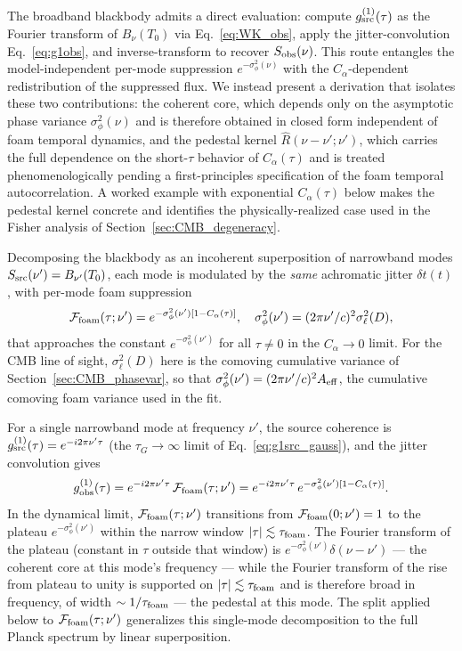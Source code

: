 \documentclass[aps,prd,onecolumn,amsmath,amssymb]{revtex4-2}
\begin{document}
The broadband blackbody admits a direct evaluation: compute
$g^{(1)}_{\rm src}(\tau)$ as the Fourier transform of $B_\nu(T_0)$
via Eq.~\eqref{eq:WK_obs}, apply the jitter-convolution
Eq.~\eqref{eq:g1obs}, and inverse-transform to recover
$S_{\rm obs}(\nu)$.  This route entangles the model-independent
per-mode suppression $e^{-\sigma_\phi^2(\nu)}$ with the
$C_\alpha$-dependent redistribution of the suppressed flux.  We
instead present a derivation that isolates these two contributions:
the coherent core, which depends only on the asymptotic phase
variance $\sigma_\phi^2(\nu)$ and is therefore obtained in closed
form independent of foam temporal dynamics, and the pedestal kernel
$\hat{R}(\nu-\nu';\nu')$, which carries the full dependence on the
short-$\tau$ behavior of $C_\alpha(\tau)$ and is treated
phenomenologically pending a first-principles specification of the
foam temporal autocorrelation.  A worked example with exponential
$C_\alpha(\tau)$ below makes the pedestal kernel concrete and
identifies the physically-realized case used in the Fisher analysis
of Section~\ref{sec:CMB_degeneracy}.

Decomposing the blackbody as an incoherent superposition of narrowband
modes $S_{\rm src}(\nu')=B_{\nu'}(T_0)$, each mode is modulated by the
\emph{same} achromatic jitter $\delta t(t)$, with per-mode foam suppression
\begin{equation}
  \mathcal{F}_{\rm foam}(\tau;\nu')
    = e^{-\sigma_\phi^2(\nu')[1-C_\alpha(\tau)]},
  \quad
  \sigma_\phi^2(\nu')=(2\pi\nu'/c)^2\sigma_\ell^2(D),
\end{equation}
that approaches the constant $e^{-\sigma_\phi^2(\nu')}$ for all
$\tau\neq 0$ in the $C_\alpha\to 0$ limit.  For the CMB line of sight,
$\sigma_\ell^2(D)$ here is the comoving cumulative variance of
Section~\ref{sec:CMB_phasevar}, so that $\sigma_\phi^2(\nu')=(2\pi\nu'/c)^2
A_{\rm eff}$, the cumulative comoving foam variance used in
the fit.

For a single narrowband mode at frequency $\nu'$, the source
coherence is $g^{(1)}_{\rm src}(\tau)=e^{-i2\pi\nu'\tau}$ (the
$\tau_G\to\infty$ limit of Eq.~\eqref{eq:g1src_gauss}), and the
jitter convolution gives
\[
  g^{(1)}_{\rm obs}(\tau)
    = e^{-i2\pi\nu'\tau}\,\mathcal{F}_{\rm foam}(\tau;\nu')
    = e^{-i2\pi\nu'\tau}\,e^{-\sigma_\phi^2(\nu')[1-C_\alpha(\tau)]}.
\]
In the dynamical limit, $\mathcal{F}_{\rm foam}(\tau;\nu')$
transitions from $\mathcal{F}_{\rm foam}(0;\nu')=1$ to the plateau
$e^{-\sigma_\phi^2(\nu')}$ within the narrow window
$|\tau|\lesssim\tau_{\rm foam}$.  The Fourier transform of the
plateau (constant in $\tau$ outside that window) is
$e^{-\sigma_\phi^2(\nu')}\delta(\nu-\nu')$ --- the coherent core at
this mode's frequency --- while the Fourier transform of the rise
from plateau to unity is supported on $|\tau|\lesssim\tau_{\rm foam}$
and is therefore broad in frequency, of width
$\sim 1/\tau_{\rm foam}$ --- the pedestal at this mode.  The split
applied below to $\mathcal{F}_{\rm foam}(\tau;\nu')$ generalizes this
single-mode decomposition to the full Planck spectrum by linear
superposition.
\end{document}
